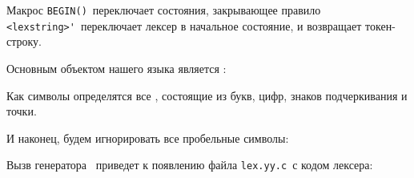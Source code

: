 
Макрос \verb|BEGIN()|\ переключает состояния, закрывающее правило
\verb|<lexstring>'|\ переключает лексер в начальное состояние, и возвращает
токен-строку.

\bigskip
Основным объектом нашего языка является :


Как символы определятся все , состоящие из букв,
цифр, знаков подчеркивания и точки.


И наконец, будем игнорировать все пробельные символы:

\bigskip
Вызв генератора \ приведет к появлению файла 
\verb|lex.yy.c|\ с кодом лексера:




\secup

\clearpage
{}
\printindex

